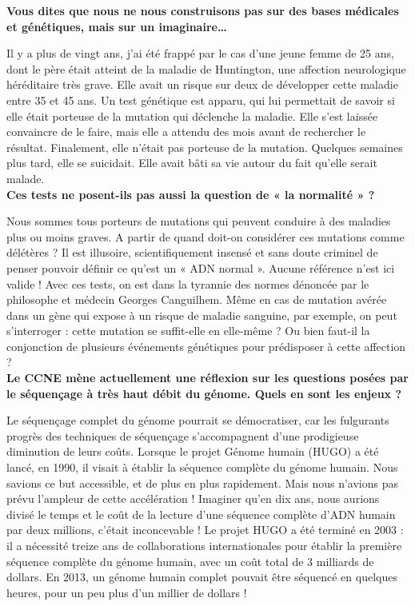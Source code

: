 \documentclass[8pt]{article}
\begin{document}
\textbf{Vous dites que nous ne nous construisons pas sur des bases médicales et génétiques, mais sur un imaginaire…}

Il y a plus de vingt ans, j’ai été frappé par le cas d’une jeune femme de 25 ans, dont le père était atteint de la maladie de Huntington, une affection neurologique héréditaire très grave. Elle avait un risque sur deux de développer cette maladie entre 35 et 45 ans. Un test génétique est apparu, qui lui permettait de savoir si elle était porteuse de la mutation qui déclenche la maladie. Elle s’est laissée convaincre de le faire, mais elle a attendu des mois avant de rechercher le résultat. Finalement, elle n’était pas porteuse de la mutation. Quelques semaines plus tard, elle se suicidait. Elle avait bâti sa vie autour du fait qu’elle serait malade. \\

\textbf{Ces tests ne posent-ils pas aussi la question de « la normalité » ?}

Nous sommes tous porteurs de mutations qui peuvent conduire à des maladies plus ou moins graves. A partir de quand doit-on considérer ces mutations comme délétères ? Il est illusoire, scientifiquement insensé et sans doute criminel de penser pouvoir définir ce qu’est un « ADN normal ». Aucune référence n’est ici valide ! Avec ces tests, on est dans la tyrannie des normes dénoncée par le philosophe et médecin Georges Canguilhem. Même en cas de mutation avérée dans un gène qui expose à un risque de maladie sanguine, par exemple, on peut s’interroger : cette mutation se suffit-elle en elle-même ? Ou bien faut-il la conjonction de plusieurs événements génétiques pour prédisposer à cette affection ? \\

\textbf{Le CCNE mène actuellement une réflexion sur les questions posées par le séquençage à très haut débit du génome. Quels en sont les enjeux ?}

Le séquençage complet du génome pourrait se démocratiser, car les fulgurants progrès des techniques de séquençage s’accompagnent d’une prodigieuse diminution de leurs coûts. Lorsque le projet Génome humain (HUGO) a été lancé, en 1990, il visait à établir la séquence complète du génome humain. Nous savions ce but accessible, et de plus en plus rapidement. Mais nous n’avions pas prévu l’ampleur de cette accélération ! Imaginer qu’en dix ans, nous aurions divisé le temps et le coût de la lecture d’une séquence complète d’ADN humain par deux millions, c’était inconcevable ! Le projet HUGO a été terminé en 2003 : il a nécessité treize ans de collaborations internationales pour établir la première séquence complète du génome humain, avec un coût total de 3 milliards de dollars. En 2013, un génome humain complet pouvait être séquencé en quelques heures, pour un peu plus d’un millier de dollars ! \\
\end{document}
